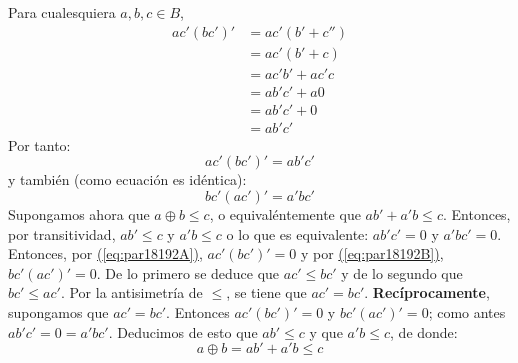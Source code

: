   \begin{solution}
    Para cualesquiera $a,b,c\in B$,
    \begin{align*}
      ac'(bc')'&=ac'(b'+c'')\\
               &=ac'(b'+c)\\
               &=ac'b'+ac'c\\
               &=ab'c'+a0\\
               &=ab'c'+0\\
               &=ab'c'
    \end{align*}
    Por tanto:
    \begin{equation}
      \label{eq:par18192A}
      ac'(bc')'=ab'c'
    \end{equation}
    y también (como ecuación es idéntica):
    \begin{equation}
      \label{eq:par18192B}
      bc'(ac')'=a'bc'
    \end{equation}
    Supongamos ahora que $a\oplus b\leq c$, o equivaléntemente que
    $ab'+a'b\leq c$. Entonces, por transitividad, $ab'\leq c$ y
    $a'b\leq c$ o lo que es equivalente: $ab'c'=0$ y
    $a'bc'=0$. Entonces, por
    \hyperref[eq:par18192A]{(\ref*{eq:par18192A})}, $ac'(bc')'=0$ y por
    \hyperref[eq:par18192B]{(\ref*{eq:par18192B})}, $bc'(ac')'=0$. De lo
    primero se deduce que $ac'\leq bc'$ y de lo segundo que
    $bc'\leq ac'$. Por la antisimetría de $\leq$, se tiene que
    $ac'=bc'$. \textbf{Recíprocamente}, supongamos que
    $ac'=bc'$. Entonces $ac'(bc')'=0$ y $bc'(ac')'=0$; como antes
    $ab'c'=0=a'bc'$. Deducimos de esto que $ab'\leq c$ y que $a'b\leq
    c$, de donde:
    \begin{equation*}
      a\oplus b = ab'+a'b\leq c
    \end{equation*}
  \end{solution}

